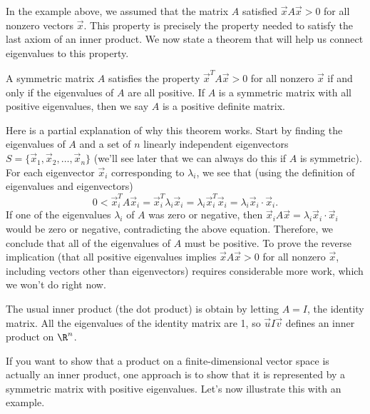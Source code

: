 In the example above, we assumed that the matrix $A$ satisfied $\vec x A \vec x>0$ for all nonzero vectors $\vec x$. This property is precisely the property needed to satisfy the last axiom of an inner product. We now state a theorem that will help us connect eigenvalues to this property.
\begin{theorem}
A symmetric matrix $A$ satisfies the property $\vec x^T A\vec x>0$ for all nonzero $\vec x$ if and only if the eigenvalues of $A$ are all positive.
If $A$ is a symmetric matrix with all positive eigenvalues, then we say $A$ is a positive definite matrix. 
\end{theorem}

Here is a partial explanation of why this theorem works. 
Start by finding the eigenvalues of $A$ and a set of $n$ linearly independent eigenvectors $S = \{\vec x_1,\vec x_2,\ldots,\vec x_n\}$ (we'll see later that we can always do this if $A$ is symmetric). For each eigenvector $\vec x_i$ corresponding to $\lambda_i$, we see that  (using the definition of eigenvalues and eigenvectors)
$$0<\vec x_i^T A \vec x_i = \vec x_i^T \lambda_i \vec x_i  = \lambda_i \vec x_i^T\vec x_i = \lambda_i \vec x_i\cdot \vec x_i.$$
If one of the eigenvalues $\lambda_i$ of $A$ was zero or negative, then $\vec x_i A\vec x=\lambda_i \vec x_i \cdot \vec x_i$ would be zero or negative, contradicting the above equation.  Therefore, we conclude that all of the eigenvalues of $A$ must be positive.  To prove the reverse implication (that all positive eigenvalues implies $\vec x A\vec x>0$ for all nonzero $\vec x$, including vectors other than eigenvectors)  requires considerable more work, which we won't do right now.

The usual inner product (the dot product) is obtain by letting $A=I$, the identity matrix. 
All the eigenvalues of the identity matrix are 1, so $\vec u I \vec v$ defines an inner product on $\R^n$. 

If you want to show that a product on a finite-dimensional vector space is actually an inner product, 
one approach is to show that it is represented by a symmetric matrix with positive eigenvalues. 
Let's now illustrate this with an example.

